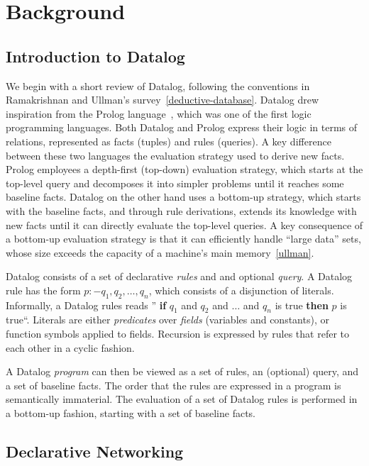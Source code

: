 \chapter[Background: A Logical Beginning]{Background}
\label{ch:p2}


\section{Introduction to Datalog}
\label{ch:p2:sec:datalog}

We begin with a short review of Datalog, following the conventions in
Ramakrishnan and Ullman's survey~\ref{deductive-database}.  Datalog drew
inspiration from the Prolog language~\cite{prolog}, which was one of the first
logic programming languages.  Both Datalog and Prolog express their logic in
terms of relations, represented as facts (tuples) and rules (queries).  A key
difference between these two languages the evaluation strategy used to derive
new facts.  Prolog employees a depth-first (top-down) evaluation strategy,
which starts at the top-level query and decomposes it into simpler problems
until it reaches some baseline facts.  Datalog on the other hand uses a
bottom-up strategy, which starts with the baseline facts, and through rule
derivations, extends its knowledge with new facts until it can directly
evaluate the top-level queries.  A key consequence of a bottom-up evaluation
strategy is that it can efficiently handle ``large data'' sets, whose size
exceeds the capacity of a machine's main memory~\ref{ullman}.

Datalog consists of a set of declarative {\em rules} and and optional {\em
query}.  A Datalog rule has the form $p :- q_1, q_2, \ldots, q_n$, which
consists of a disjunction of literals.  Informally, a Datalog rules reads ''{\bf
if} $q_1$ and $q_2$ and $\ldots$ and $q_n$ is true {\bf then} $p$ is true``.
Literals are either {\em predicates} over {\em fields} (variables and
constants), or function symbols applied to fields.  Recursion is expressed by
rules that refer to each other in a cyclic fashion.

A Datalog {\em program} can then be viewed as a set of rules, an (optional)
query, and a set of baseline facts.  The order that the rules are expressed in
a program is semantically immaterial.  The evaluation of a set of Datalog rules
is performed in a bottom-up fashion, starting with a set of baseline facts.


\section{Declarative Networking}

